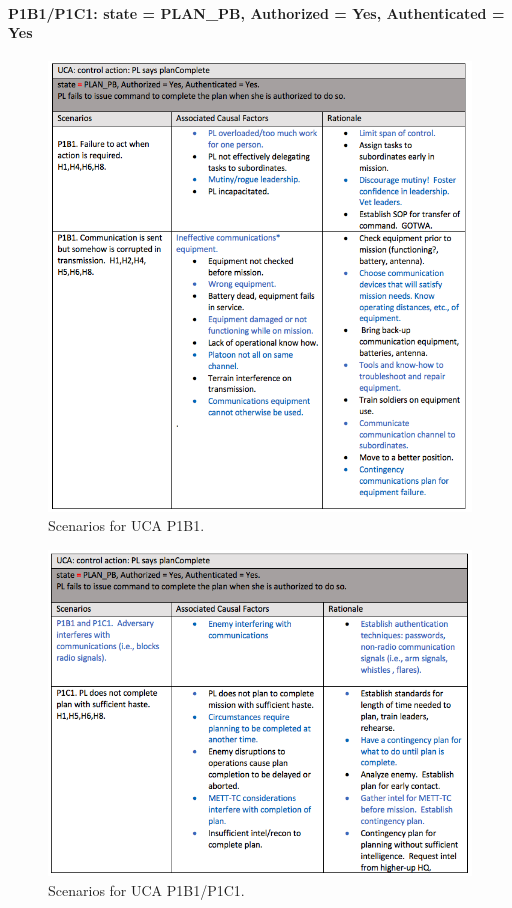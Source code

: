 \documentclass[../../main/main.tex]{subfiles}
\begin{document}
\paragraph*{P1B1/P1C1: state = PLAN_PB, Authorized = Yes, Authenticated = Yes}

\begin{figure}[ht!]
\begin{center}
\includegraphics[width=\linewidth]{../figures/ucap1b1}
\caption{Scenarios for UCA P1B1.}
\label{ucap1b1}
\end{center}
\end{figure}
\clearpage


\begin{figure}[ht!]
\begin{center}
\includegraphics[width=\linewidth]{../figures/ucap1b1p1c1}
\caption{Scenarios for UCA P1B1/P1C1.}
\label{ucap1b1p1c1}
\end{center}
\end{figure}
\clearpage
\end{document}
